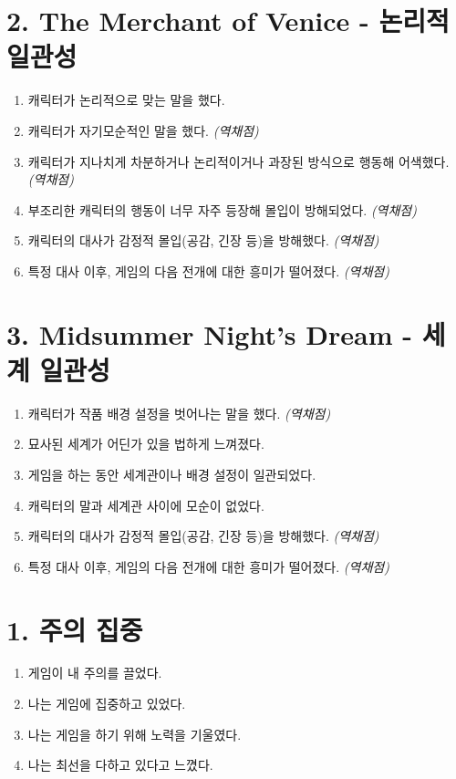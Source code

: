 \documentclass[12pt]{article}
\begin{document}
\section*{2. The Merchant of Venice - 논리적 일관성}

\begin{enumerate}[label=\arabic*.]
    \item 캐릭터가 논리적으로 맞는 말을 했다.
    \item 캐릭터가 자기모순적인 말을 했다. \textit{(역채점)}
    \item 캐릭터가 지나치게 차분하거나 논리적이거나 과장된 방식으로 행동해 어색했다. \textit{(역채점)}
    \item 부조리한 캐릭터의 행동이 너무 자주 등장해 몰입이 방해되었다. \textit{(역채점)}
    \item 캐릭터의 대사가 감정적 몰입(공감, 긴장 등)을 방해했다. \textit{(역채점)}
    \item 특정 대사 이후, 게임의 다음 전개에 대한 흥미가 떨어졌다. \textit{(역채점)}
\end{enumerate}

\section*{3. Midsummer Night's Dream - 세계 일관성}

\begin{enumerate}[label=\arabic*.]
    \item 캐릭터가 작품 배경 설정을 벗어나는 말을 했다. \textit{(역채점)}
    \item 묘사된 세계가 어딘가 있을 법하게 느껴졌다.
    \item 게임을 하는 동안 세계관이나 배경 설정이 일관되었다.
    \item 캐릭터의 말과 세계관 사이에 모순이 없었다.
    \item 캐릭터의 대사가 감정적 몰입(공감, 긴장 등)을 방해했다. \textit{(역채점)}
    \item 특정 대사 이후, 게임의 다음 전개에 대한 흥미가 떨어졌다. \textit{(역채점)}
\end{enumerate}

\section*{1. 주의 집중}

\begin{enumerate}[label=\arabic*.]
  \item 게임이 내 주의를 끌었다.
  \item 나는 게임에 집중하고 있었다.
  \item 나는 게임을 하기 위해 노력을 기울였다.
  \item 나는 최선을 다하고 있다고 느꼈다.
\end{enumerate}
\end{document}
